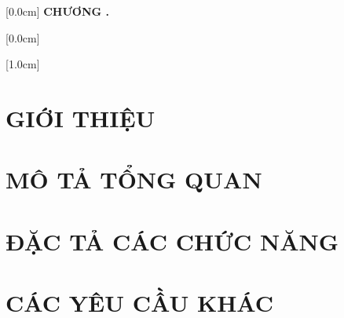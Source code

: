 ﻿\documentclass[a4paper,13pt,3p,oneside]{report}
\title{\bf \TITLE}
\author{\AUTHOR}
\renewcommand{\headrulewidth}{0pt} %
\theoremstyle{definition}
\begin{document}

\clearpage
{} 
\renewcommand*\contentsname{MỤC LỤC}

    [0.0cm]             %
    {\bfseries\vspace{0.3cm}}                  %
    {{\bfseries{\scshape} CHƯƠNG \thecontentslabel.\ }} %
    {}         %
    {\contentspage}         %

    [0.0cm]             %
    {\vspace{0.3cm}}                  %
    {\thecontentslabel \ } %
    {}         %
    {\contentspage}
    
    [1.0cm]             %
    {\vspace{0.3cm}}                  %
    {\thecontentslabel \ } %
    {}         %
    {\contentspage}

\tableofcontents 
\thispagestyle{empty}
\clearpage


\pagestyle{fancy}
\fancyhf{} 
\renewcommand{\headrulewidth}{0pt} 
\fancyfoot[C]{\thepage} 


\clearpage
\chapter{GIỚI THIỆU}
\label{chapter:Introduction}


\clearpage
\chapter{MÔ TẢ TỔNG QUAN}
\label{chapter:Overview}


\clearpage
\chapter{ĐẶC TẢ CÁC CHỨC NĂNG}
\label{chapter:FunctionalReqs}
 

\clearpage
\chapter{CÁC YÊU CẦU KHÁC}
\label{chapter:OtherReqs}

\end{document}

